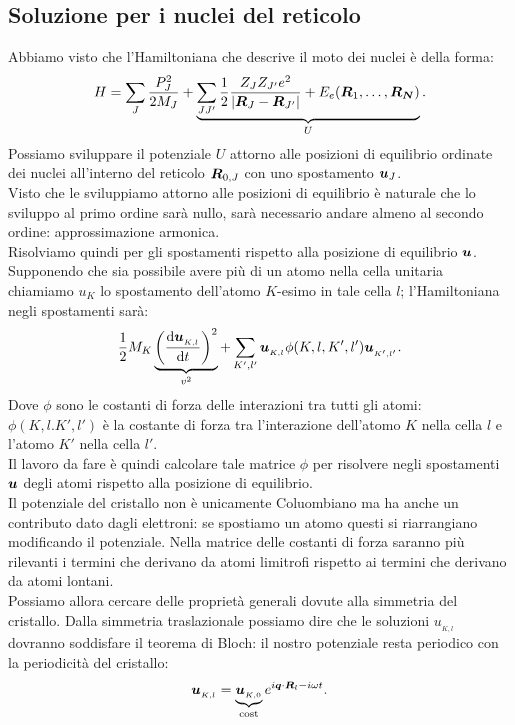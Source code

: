 \subsection{Soluzione per i nuclei del reticolo}
\label{subsec:Soluzione per i nuclei del reticolo}
Abbiamo visto che l'Hamiltoniana che descrive il moto dei nuclei è della forma:
\[
	H 
	=
	\sum_{J}^{} \frac{P_{J}^2}{2M_J} 
	+
	\underbrace{
	\sum_{JJ'}^{} 
	\frac{1}{2}\frac{Z_J Z_{J'}e^2}{\left| \boldsymbol{R}_J - \boldsymbol{R}_{J'} \right| }
	+
	E_e(\boldsymbol{R}_1,\ldots,\boldsymbol{R_N})
	}_
	{U}
.\] 
Possiamo sviluppare il potenziale $U$ attorno alle posizioni di equilibrio ordinate dei nuclei all'interno del reticolo $\boldsymbol{R}_{0,J}$ con uno spostamento $\boldsymbol{u}_{J}$.\\
Visto che le sviluppiamo attorno alle posizioni di equilibrio è naturale che lo sviluppo al primo ordine sarà nullo, sarà necessario andare almeno al secondo ordine: approssimazione armonica. \\
Risolviamo quindi per gli spostamenti rispetto alla posizione di equilibrio $\boldsymbol{u}$.
Supponendo che sia possibile avere più di un atomo nella cella unitaria chiamiamo $u_K$ lo spostamento dell'atomo $K$-esimo in tale cella $l$; l'Hamiltoniana negli spostamenti sarà:
\[
	\frac{1}{2} M_{K}
	\underbrace{
	\left( \frac{\mbox{d} \boldsymbol{u}_{_{K,l}}}{\mbox{d} t}  \right)^2
	}_{v^2}
	+
	\sum_{K',l'}^{} \boldsymbol{u}_{_{K,l}}\phi(K,l,K',l')\boldsymbol{u}_{_{K',l'}}
.\] 
Dove $\phi$ sono le costanti di forza delle interazioni tra tutti gli atomi: $\phi(K,l.K',l')$ è la costante di forza tra l'interazione dell'atomo $K$ nella cella $l$ e l'atomo $K'$ nella cella $l'$.\\
Il lavoro da fare è quindi calcolare tale matrice $\phi$ per risolvere negli spostamenti $\boldsymbol{u}$ degli atomi rispetto alla posizione di equilibrio. \\
Il potenziale del cristallo non è unicamente Coluombiano ma ha anche un contributo dato dagli elettroni: se spostiamo un atomo questi si riarrangiano modificando il potenziale. 
Nella matrice delle costanti di forza saranno più rilevanti i termini che derivano da atomi limitrofi rispetto ai termini che derivano da atomi lontani.\\
Possiamo allora cercare delle proprietà generali dovute alla simmetria del cristallo. Dalla simmetria traslazionale possiamo dire che le soluzioni $u_{_{K,l}}$ dovranno soddisfare il teorema di Bloch: il nostro potenziale resta periodico con la periodicità del cristallo:
\[
	\boldsymbol{u}_{_{K,l}} = 
	\underbrace{
		\boldsymbol{u}_{_{K,0}} 
	}_{\text{cost}}
	e^{i\boldsymbol{q}\cdot\boldsymbol{R}_l -i\omega t}
	\label{eq:onda-bloch}
.\] 
